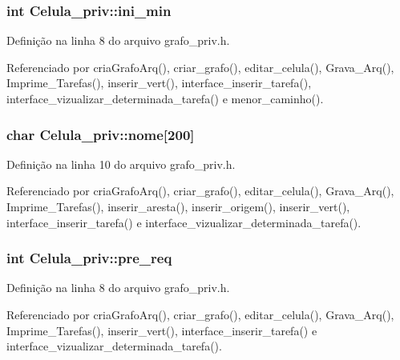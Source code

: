 \subsubsection[{ini\+\_\+min}]{\setlength{\rightskip}{0pt plus 5cm}int Celula\+\_\+priv\+::ini\+\_\+min}\label{structCelula__priv_a3c49601fe078bd7bb1512f0107af5301}


Definição na linha 8 do arquivo grafo\+\_\+priv.\+h.



Referenciado por cria\+Grafo\+Arq(), criar\+\_\+grafo(), editar\+\_\+celula(), Grava\+\_\+\+Arq(), Imprime\+\_\+\+Tarefas(), inserir\+\_\+vert(), interface\+\_\+inserir\+\_\+tarefa(), interface\+\_\+vizualizar\+\_\+determinada\+\_\+tarefa() e menor\+\_\+caminho().

\hypertarget{structCelula__priv_a7f33fa72aceed7b44922f0f39d6f7f59}{}
\subsubsection[{nome}]{\setlength{\rightskip}{0pt plus 5cm}char Celula\+\_\+priv\+::nome\mbox{[}200\mbox{]}}\label{structCelula__priv_a7f33fa72aceed7b44922f0f39d6f7f59}


Definição na linha 10 do arquivo grafo\+\_\+priv.\+h.



Referenciado por cria\+Grafo\+Arq(), criar\+\_\+grafo(), editar\+\_\+celula(), Grava\+\_\+\+Arq(), Imprime\+\_\+\+Tarefas(), inserir\+\_\+aresta(), inserir\+\_\+origem(), inserir\+\_\+vert(), interface\+\_\+inserir\+\_\+tarefa() e interface\+\_\+vizualizar\+\_\+determinada\+\_\+tarefa().

\hypertarget{structCelula__priv_a3ff8d3c4d0ba994771391320203619fc}{}
\subsubsection[{pre\+\_\+req}]{\setlength{\rightskip}{0pt plus 5cm}int Celula\+\_\+priv\+::pre\+\_\+req}\label{structCelula__priv_a3ff8d3c4d0ba994771391320203619fc}


Definição na linha 8 do arquivo grafo\+\_\+priv.\+h.



Referenciado por cria\+Grafo\+Arq(), criar\+\_\+grafo(), editar\+\_\+celula(), Grava\+\_\+\+Arq(), Imprime\+\_\+\+Tarefas(), inserir\+\_\+vert(), interface\+\_\+inserir\+\_\+tarefa() e interface\+\_\+vizualizar\+\_\+determinada\+\_\+tarefa().

